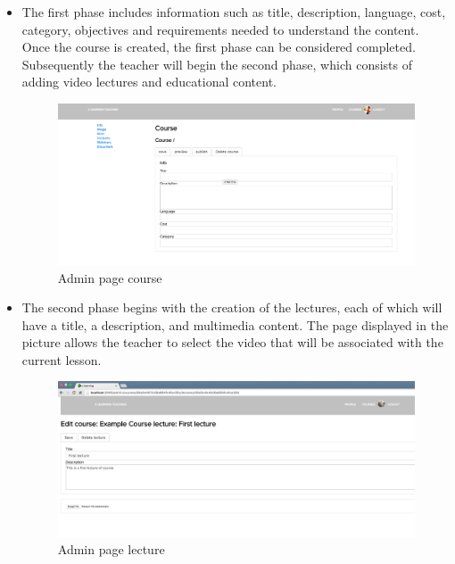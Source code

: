 \begin{itemize}
\item The first phase includes information such as title, description, language, cost, category, objectives and requirements needed to understand the content. Once the course is created, the first phase can be considered completed.
Subsequently the teacher will begin the second phase, which consists of adding video lectures and educational content.

\begin{figure}[htb]
 \centering
 \includegraphics[width=1.0\linewidth]{images/chapter6/insert_course_page.png}\hfill
 \caption[Admin page course]{Admin page course}
 \label{fig:fourV}
\end{figure}

\item The second phase begins with the creation of the lectures, each of which will have a title, a description, and multimedia content.
The page displayed in the picture allows the teacher to select the video that will be associated with the current lesson.

\begin{figure}[htb]
 \centering
 \includegraphics[width=1.0\linewidth]{images/chapter6/insert_lecture.png}\hfill
 \caption[Admin page lecture]{Admin page lecture}
 \label{fig:fourV}
\end{figure}

\end{itemize}

